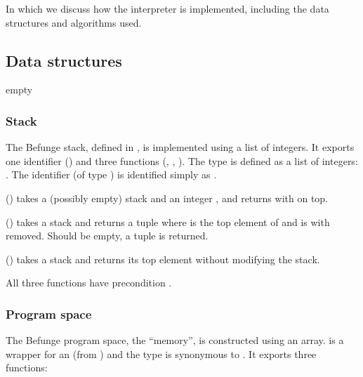 \documentclass[12pt, a4paper]{article}
\begin{document}
In which we discuss how the interpreter is implemented, including the data structures and algorithms used.

\subsection{Data structures}
\label{sec:structures}

empty

\subsubsection{Stack}
\label{sec:structstack}

The Befunge stack, defined in , is implemented using a list of integers. It exports one identifier () and three functions (, , ). The type  is defined as a list of integers: . The identifier  (of type ) is identified simply as .

\vspace{6pt}
\noindent
{} () takes a (possibly empty) stack  and an integer , and returns  with  on top.

\vspace{6pt}
\noindent
{} () takes a stack  and returns a tuple  where  is the top element of  and  is  with  removed. Should  be empty, a tuple  is returned.

\vspace{6pt}
\noindent
{} () takes a stack and returns its top element without modifying the stack.

\vspace{6pt}
\noindent
All three functions have precondition .

\subsubsection{Program space}
\label{sec:structmem}

The Befunge program space, the “memory”, is constructed using an array.  is a wrapper for an  (from ) and the type  is synonymous to . It exports three functions:
\end{document}
